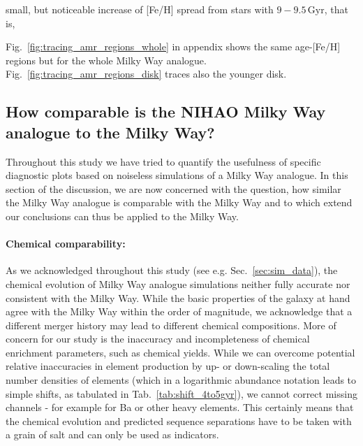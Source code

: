 \documentclass[fleqn,usenatbib]{mnras}
\begin{document}
small, but noticeable increase of [Fe/H] spread from stars with $9-9.5\,\mathrm{Gyr}$, that is, 


Fig.~\ref{fig:tracing_amr_regions_whole} in appendix shows the same age-[Fe/H] regions but for the whole Milky Way analogue. Fig.~\ref{fig:tracing_amr_regions_disk} traces also the younger disk.


\subsection{How comparable is the NIHAO Milky Way analogue to the Milky Way?} \label{sec:discussion_how_comparable_are_nihao_and_milkyway}

Throughout this study we have tried to quantify the usefulness of specific diagnostic plots based on noiseless simulations of a Milky Way analogue. In this section of the discussion, we are now concerned with the question, how similar the Milky Way analogue is comparable with the Milky Way and to which extend our conclusions can thus be applied to the Milky Way.

\paragraph*{Chemical comparability:} As we acknowledged throughout this study (see e.g. Sec.~\ref{sec:sim_data}), the chemical evolution of Milky Way analogue simulations neither fully accurate nor consistent with the Milky Way. While the basic properties of the galaxy at hand agree with the Milky Way within the order of magnitude, we acknowledge that a different merger history may lead to different chemical compositions. More of concern for our study is the inaccuracy and incompleteness of chemical enrichment parameters, such as chemical yields. While we can overcome potential relative inaccuracies in element production by up- or down-scaling the total number densities of elements (which in a logarithmic abundance notation leads to simple shifts, as tabulated in Tab.~\ref{tab:shift_4to5gyr}), we cannot correct missing channels - for example for Ba or other heavy elements. This certainly means that the chemical evolution and predicted sequence separations have to be taken with a grain of salt and can only be used as indicators.
\end{document}
